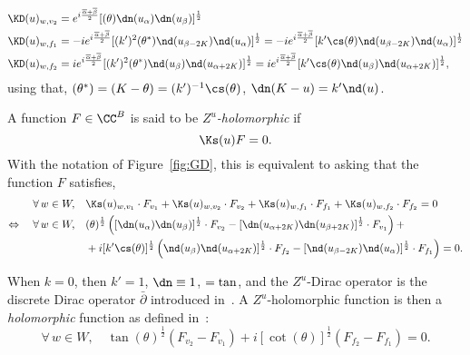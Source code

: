 \documentclass[a4paper,twoside,11pt]{article}
\begin{document}
\begin{exm}
\begin{align*}
\KD(u)_{w,v_2}&=e^{i\frac{\overline{\alpha}+\overline{\beta}}{2}}[\sc(\theta)\dn(u_{\alpha})\dn(u_{\beta})]^{\frac{1}{2}}\\ 
\KD(u)_{w,f_1}&=-ie^{i\frac{\overline{\alpha}+\overline{\beta}}{2}}[(k')^2\sc(\theta^*)\nd(u_{\beta-2K})\nd(u_\alpha)]^{\frac{1}{2}}=
-ie^{i\frac{\overline{\alpha}+\overline{\beta}}{2}}[k'\cs(\theta)\nd(u_{\beta-2K})\nd(u_\alpha)]^{\frac{1}{2}}\\
\KD(u)_{w,f_2}&=ie^{i\frac{\overline{\alpha}+\overline{\beta}}{2}}
[(k')^2\sc(\theta^*)\nd(u_{\beta})\nd(u_{\alpha+2K})]^{\frac{1}{2}}=
ie^{i\frac{\overline{\alpha}+\overline{\beta}}{2}}[k'\cs(\theta)\nd(u_{\beta})\nd(u_{\alpha+2K})]^{\frac{1}{2}},
\end{align*} 
using that, $\sc(\theta^*)=\sc(K-\theta)=(k')^{-1}\cs(\theta)$, $\dn(K-u)=k'\nd(u)$.
\end{exm}

\begin{defi}
A function $F\in\CC^B$ is said to be \emph{$Z^u$-holomorphic} if 
\begin{equation*}
\Ks(u)F=0.
\end{equation*}
With the notation of Figure~\ref{fig:GD}, this is equivalent to asking that the function $F$ satisfies, 
\begin{align*}
\forall\,w \in W,&\quad\Ks(u)_{w,v_1}\cdot F_{v_1}+\Ks(u)_{w,v_2}\cdot F_{v_2}+\Ks(u)_{w,f_1}\cdot F_{f_1}+\Ks(u)_{w,f_2}\cdot F_{f_2}=0\\
\Leftrightarrow\quad  \forall\,w \in W,& \quad \sc(\theta)^\frac{1}{2}\left( [\dn(u_{\alpha})\dn(u_{\beta})]^{\frac{1}{2}}\cdot F_{v_2}-
 [\dn(u_{\alpha+2K})\dn(u_{\beta+2K})]^{\frac{1}{2}}\cdot F_{v_1}\right)+\\
&\quad +i[k'\cs(\theta)]^\frac{1}{2}\left(\nd(u_{\beta})\nd(u_{\alpha+2K})]^{\frac{1}{2}}\cdot F_{f_2}
-[\nd(u_{\beta-2K})\nd(u_\alpha)]^{\frac{1}{2}}\cdot F_{f_1}\right)=0.
\end{align*}
\end{defi}

\begin{rem}\label{rem:Zu_Dirac}
When $k=0$, then $k'=1$, $\dn\equiv 1$, $\sc=\tan$, and the $Z^u$-Dirac operator is the discrete Dirac operator $\bar{\partial}$ 
introduced in~\cite{Kenyon3}. A
$Z^u$-holomorphic function is then a \emph{holomorphic} function as defined in~\cite{Duffin,Mercat:ising,Kenyon3,ChelkakSmirnov:toolbox}:
\[
\forall\,w\in W,\quad 
\tan(\theta)^\frac{1}{2}\left(F_{v_2}-F_{v_1}\right)
+i[\cot(\theta)]^\frac{1}{2}\left(F_{f_2}-F_{f_1}\right)=0.
\]
\end{rem}
\end{document}
